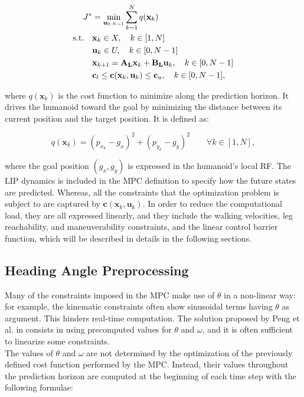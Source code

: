 \documentclass[main.tex]{subfiles}
\begin{document}
\begin{align}
    J^* &= \min_{\mathbf{u}_{0:N-1}} \sum_{k=1}^{N} q(\mathbf{x}_k) \\
    \text{s.t.} \quad
    &\mathbf{x}_k \in X, \quad k \in [1, N] \notag \\
    &\mathbf{u}_k \in U, \quad k \in [0, N-1] \notag \\
    &\mathbf{x}_{k+1} = \mathbf{A_L} \mathbf{x}_k + \mathbf{B_L} \mathbf{u}_k, \quad k \in [0, N-1] \notag \\
    &\mathbf{c}_l \leq \mathbf{c}(\mathbf{x}_k, \mathbf{u}_k) \leq \mathbf{c}_u, \quad k \in [0, N-1], \notag
    \label{eq:lip-mpc}
\end{align}

where $q(\mathbf{x}_k)$ is the cost function to minimize along the prediction horizon. It drives the humanoid toward the goal by minimizing the distance between its current position and the target position. It is defined as:

$$
q(\mathbf{x}_k) = \left( p_{x_k} - g_x \right)^2 + \left( p_{y_k} - g_y \right)^2 \qquad \forall k \in \left[1, N\right],
$$

where the goal position $(g_x, g_y)$ is expressed in the humanoid's local RF. The LIP dynamics is included in the MPC definition to specify how the future states are predicted. Whereas, all the constraints that the optimization problem is subject to are captured by $\mathbf{c}(\mathbf{x}_k, \mathbf{u}_k)$. In order to reduce the computational load, they are all expressed linearly, and they include the walking velocities, leg reachability, and maneuverability constraints, and the linear control barrier function, which will be described in details in the following sections.

\subsection{Heading Angle Preprocessing}
Many of the constraints imposed in the MPC make use of $\theta$ in a non-linear way: for example, the kinematic constraints often show sinusoidal terms having $\theta$ as argument. This hinders real-time computation. The solution proposed by Peng et al. in \cite{peng_main_paper} consists in using precomputed values for $\theta$ and $\omega$, and it is often sufficient to linearize some constraints.\\
The values of $\theta$ and $\omega$ are not determined by the optimization of the previously defined cost function performed by the MPC. Instead, their values throughout the prediction horizon are computed at the beginning of each time step with the following formulae:
\end{document}
